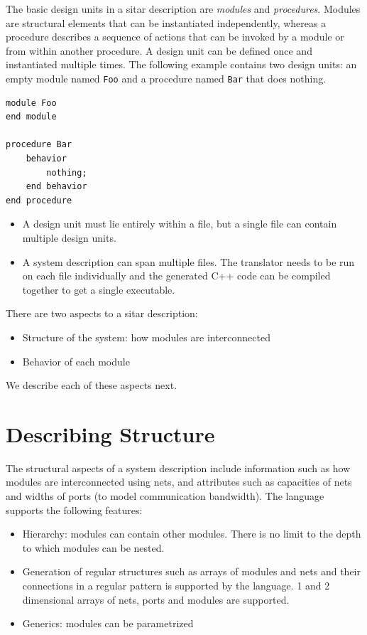 \documentclass[12pt,a4paper]{report}
\begin{document}
The basic design units in a sitar description are {\em modules} and {\em procedures}. 
Modules are structural elements that can be instantiated independently, 
whereas a procedure describes a sequence of actions
that can be invoked by a module or from within another procedure.
A design unit can be defined once and instantiated multiple times.
The following example contains two design units: an empty module named {\tt Foo}
and a procedure named {\tt Bar} that does nothing.
\begin{Verbatim}[frame=single]
module Foo
end module

procedure Bar
	behavior
		nothing;
	end behavior
end procedure
\end{Verbatim}

\begin{itemize}
\item A design unit must lie entirely
within a file, but a single file can contain multiple design units.

\item A system description can span multiple files. The translator
needs to be run on each file individually and the generated C++ code
can be compiled together to get a single executable.
\end{itemize}

There are two aspects to a sitar description:
\begin{itemize}
	\item Structure of the system: how modules are interconnected
	\item Behavior of each module
\end{itemize}
We describe each of these aspects next.


\section {Describing Structure}
	The structural aspects of a system description include information such as
	how modules are interconnected using nets, and attributes such as 
	capacities of nets and widths of ports (to model communication bandwidth).
	The language supports the following features:
	\begin{itemize}
	\item Hierarchy: modules can contain other modules. There is no limit 
	to the depth to which modules can be nested.
	\item Generation of regular structures such as arrays of modules and nets
	and their connections in a regular pattern is supported by the language.
	1 and 2 dimensional arrays of nets, ports and modules are supported.
	\item Generics: modules can be parametrized
	\end{itemize}
\end{document}
